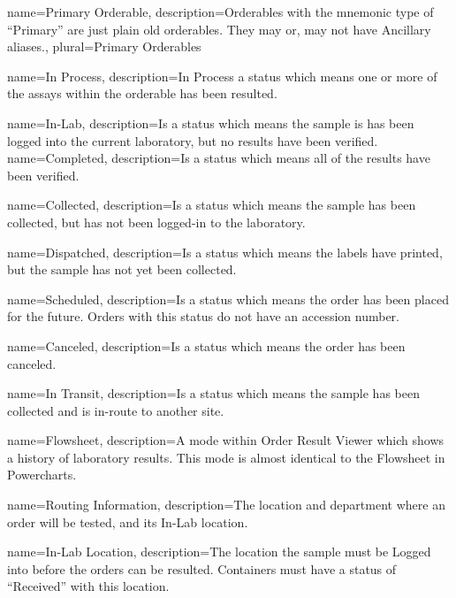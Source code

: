 {
    name={Primary Orderable},
    description={Orderables with the mnemonic type of ``Primary'' are just plain old orderables. They may or, may not  have Ancillary aliases.},
    plural=Primary Orderables
}

{
    name={In Process},
    description={In Process a status which means one or more of the assays within the orderable has been resulted. }
}

{
    name={In-Lab},
    description={Is a status which means the sample is has been logged into the current laboratory, but no results have been verified.}
}
{
    name={Completed},
    description={Is a status which means all of the results have been verified.}
}

{
    name={Collected},
    description={Is a status which means the sample has been collected, but has not been logged-in to the laboratory.}
}

{
    name={Dispatched},
    description={Is a status which means the labels have printed, but the sample has not yet been collected.}
}

{
    name={Scheduled},
    description={Is a status which means the order has been placed for the future. Orders with this status do not have an accession number.}
}

{
    name={Canceled},
    description={Is a status which means the order has been canceled.}
}

{
    name={In Transit},
    description={Is a status which means the sample has been collected and is in-route to another site.}
}

{
    name={Flowsheet},
    description={A mode within Order Result Viewer which shows a history of laboratory results. This mode is almost identical to the Flowsheet in Powercharts.}
}

{
    name={Routing Information},
    description={The location and department where an order will be tested, and its In-Lab location.}
}

{
    name={In-Lab Location},
    description={The location the sample must be Logged into before the orders can be resulted. Containers must have a status of ``Received'' with this location.}
}


